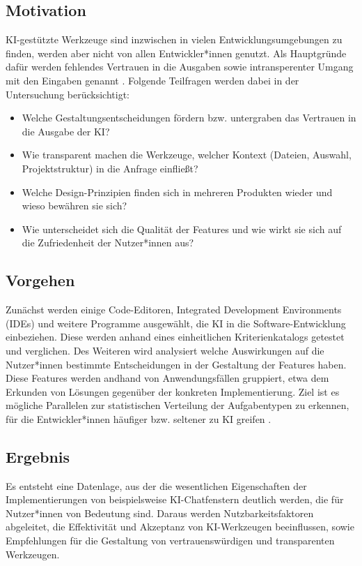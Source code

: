\documentclass[ngerman]{article}
\begin{document}
    \subsection{Motivation}
    KI-gestützte Werkzeuge sind inzwischen in vielen Entwicklungsumgebungen zu finden, werden aber nicht von allen Entwickler*innen genutzt. Als Hauptgründe dafür werden fehlendes Vertrauen in die Ausgaben sowie intransperenter Umgang mit den Eingaben genannt \cite{Sergeyuk_2025}. Folgende Teilfragen werden dabei in der Untersuchung berücksichtigt:
    \begin{itemize}
      \item Welche Gestaltungsentscheidungen fördern bzw. untergraben das Vertrauen in die Ausgabe der KI?
      \item Wie transparent machen die Werkzeuge, welcher Kontext (Dateien, Auswahl, Projektstruktur) in die Anfrage einfließt?
      \item Welche Design-Prinzipien finden sich in mehreren Produkten wieder und wieso bewähren sie sich?
      \item Wie unterscheidet sich die Qualität der Features und wie wirkt sie sich auf die Zufriedenheit der Nutzer*innen aus?
    \end{itemize}

    \subsection{Vorgehen}
    Zunächst werden einige Code-Editoren, Integrated Development Environments (IDEs) und weitere Programme ausgewählt, die KI in die Software-Entwicklung einbeziehen. Diese werden anhand eines einheitlichen Kriterienkatalogs getestet und verglichen. Des Weiteren wird analysiert welche Auswirkungen auf die Nutzer*innen bestimmte Entscheidungen in der Gestaltung der Features haben. Diese Features werden andhand von Anwendungsfällen gruppiert, etwa dem Erkunden von Lösungen gegenüber der konkreten Implementierung. Ziel ist es mögliche Parallelen zur statistischen Verteilung der Aufgabentypen zu erkennen, für die Entwickler*innen häufiger bzw. seltener zu KI greifen \cite{barke2022groundedcopilotprogrammersinteract}.

    \subsection{Ergebnis}
    Es entsteht eine Datenlage, aus der die wesentlichen Eigenschaften der Implementierungen von beispielsweise KI-Chatfenstern deutlich werden, die für Nutzer*innen von Bedeutung sind. Daraus werden Nutzbarkeitsfaktoren abgeleitet, die Effektivität und Akzeptanz von KI-Werkzeugen beeinflussen, sowie Empfehlungen für die Gestaltung von vertrauenswürdigen und transparenten Werkzeugen.
\end{document}
